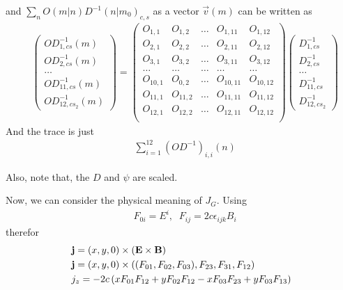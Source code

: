 and $\sum _n O(m|n)D^{-1}(n|m_0)_{c,s}$ as a vector $\vec{v}(m)$ can be written as
\begin{equation}
\begin{split}
&\left(\begin{array}{c} OD^{-1}_{1,cs}(m) \\ OD^{-1}_{2,cs}(m)  \\ \ldots  \\ OD^{-1}_{11,cs}(m) \\ OD^{-1}_{12,cs_2}(m) \end{array}\right)=\left(\begin{array}{ccccc}
O_{1,1} & O_{1,2} & \ldots &  O_{1,11} & O_{1,12} \\
O_{2,1} & O_{2,2} & \ldots &  O_{2,11} & O_{2,12} \\
O_{3,1} & O_{3,2} & \ldots &  O_{3,11} & O_{3,12} \\
\ldots & \ldots & \ldots &  \ldots & \ldots \\
O_{10,1} & O_{0,2} & \ldots & O_{10,11} & O_{10,12} \\
O_{11,1} & O_{11,2} & \ldots & O_{11,11} & O_{11,12} \\
O_{12,1} & O_{12,2} & \ldots &  O_{12,11} & O_{12,12} \\
 \end{array}\right)\left(\begin{array}{c} D^{-1}_{1,cs} \\ D^{-1}_{2,cs} \\ \ldots \\ D^{-1}_{11,cs} \\ D^{-1}_{12,cs_2}\end{array}\right)
\end{split}
\end{equation}
And the trace is just
\begin{equation}
\begin{split}
&\sum _{i=1}^{12}(OD^{-1})_{i,i}(n)
\end{split}
\end{equation}

Also, note that, the $D$ and $\psi$ are scaled.

Now, we can consider the physical meaning of $J_G$. Using
\begin{equation}
\begin{split}
&F_{0i}=E^i,\;\;F_{ij}=2c\epsilon _{ijk}B_i
\end{split}
\end{equation}
therefor
\begin{equation}
\begin{split}
&{\bf j}=(x,y,0)\times \left({\bf E}\times {\bf B}\right)\\
&{\bf j}=(x,y,0) \times \left( (F_{01},F_{02},F_{03}), F_{23},F_{31},F_{12} \right)\\
&j_z=-2c\left(x F_{01}F_{12}+yF_{02}F_{12}-xF_{03}F_{23}+yF_{03}F_{13}\right)\\
\end{split}
\end{equation}

